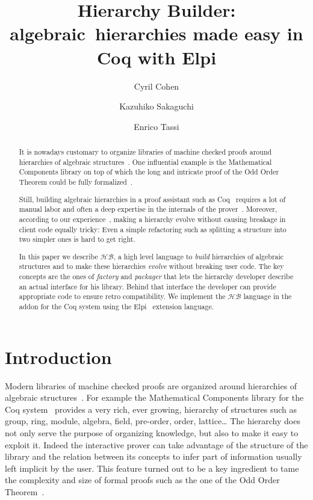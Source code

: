 \documentclass[a4paper,UKenglish,cleveref, autoref]{lipics-v2019}
\title{Hierarchy Builder: algebraic~hierarchies made easy in Coq with Elpi} %
\author{Cyril Cohen}{Inria, France}{Cyril.Cohen@inria.fr}{}{}
\author{Kazuhiko Sakaguchi}{University of Tsukuba, Japan}{sakaguchi@logic.cs.tsukuba.ac.jp}{}{}
\author{Enrico Tassi}{Inria, France}{Enrico.Tassi@inria.fr}{}{}
\newcommand{\HB}{\ensuremath{\mathcal{HB}}}
\newcommand{\hb}{\coq{hierarchy-builder}}
\newcommand{\factory}{factory}
\newcommand{\packager}{packager}
\theoremstyle{implem}
\theoremstyle{implem}
\theoremstyle{axiom}
\theoremstyle{abscommand}
\theoremstyle{command}
\begin{document}
\maketitle

\begin{abstract}
It is nowadays customary to organize libraries of machine checked
proofs around hierarchies of algebraic
structures~\cite{10.1145/3372885.3373824,mathclasses,DBLP:journals/mics/BoldoLM15,DBLP:conf/mpc/AffeldtNS19}.
One influential example is the Mathematical Components library on top
of which the long and intricate proof of the Odd Order
Theorem could be fully formalized~\cite{DBLP:conf/itp/GonthierAABCGRMOBPRSTT13}.

Still, building algebraic hierarchies in a proof assistant such as Coq~\cite{Coq:manual}
requires a lot of manual labor and often a deep expertise in the internals of
the prover~\cite{DBLP:conf/tphol/GarillotGMR09,DBLP:conf/itp/MahboubiT13}.
Moreover, according to our experience~\cite{KSdraft},
making a hierarchy evolve without causing breakage in client code equally tricky:
Even a simple refactoring such as splitting a structure into two simpler ones
is hard to get right.

In this paper we describe \HB{}, a high level language
to \emph{build} hierarchies of algebraic structures and to make these hierarchies
\emph{evolve} without breaking user code. The key concepts are the ones of
\emph{\factory{}} and \emph{\packager{}} that lets the hierarchy developer
describe an actual
interface for his library. Behind that interface the developer can provide
appropriate code to ensure retro compatibility.
We implement the \HB{} language in the \hb{} addon for the Coq
system using the Elpi~\cite{DBLP:conf/lpar/DunchevGCT15,CoqElpi}
extension language.
\end{abstract}

\section{Introduction}

Modern libraries of machine checked proofs are organized around
hierarchies of algebraic structures~\cite{10.1145/3372885.3373824,mathclasses,DBLP:journals/mics/BoldoLM15,DBLP:conf/mpc/AffeldtNS19}.
For example the Mathematical Components library for the Coq system~\cite{Coq:manual}
provides a very rich, ever growing, hierarchy of structures such as
group, ring, module, algebra, field, pre-order, order, lattice\ldots
The hierarchy does not only serve the purpose of organizing knowledge, but
also to make it easy to exploit it. Indeed the interactive prover can
take advantage of the structure of the library and the relation between
its concepts to infer part of information usually left implicit
by the user. This feature turned out to be a key ingredient to tame
the complexity and size of formal proofs such as the one of the Odd Order
Theorem~\cite{DBLP:conf/itp/GonthierAABCGRMOBPRSTT13}.
\end{document}

